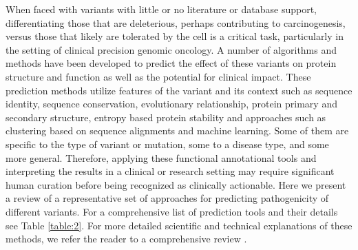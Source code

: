 \documentclass[10pt,letterpaper]{article}
\begin{document}
When faced with variants with little or no literature or database
support, differentiating those that are deleterious, perhaps
contributing to carcinogenesis, versus those that likely are tolerated
by the cell is a critical task, particularly in the setting of
clinical precision genomic oncology.  A number of algorithms and
methods have been developed to predict the effect of these variants on
protein structure and function as well as the potential for clinical
impact. These prediction methods utilize features of the variant and
its context such as sequence identity, sequence conservation,
evolutionary relationship, protein primary and secondary structure,
entropy based protein stability and approaches such as clustering
based on sequence alignments and machine learning. Some of them are
specific to the type of variant or mutation, some to a disease type,
and some more general. Therefore, applying these functional
annotational tools and interpreting the results in a clinical or
research setting may require significant human curation before being
recognized as clinically actionable. Here we present a review of a
representative set of approaches for predicting pathogenicity of
different variants. For a comprehensive list of prediction tools and
their details see Table \ref{table:2}. For more detailed scientific and technical
explanations of these methods, we refer the reader to a comprehensive
review \cite{Addepalli2014-oa}.
\end{document}
